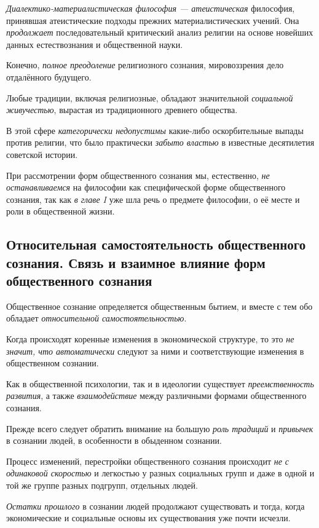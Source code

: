 \documentclass[a4paper,14pt,russian]{extreport}
\begin{document}
\emph{Диалектико-материалистическая философия --- атеистическая} философия, принявшая атеистические подходы прежних материалистических учений. Она \emph{продолжает} последовательный критический анализ религии на основе новейших данных естествознания и общественной науки.

Конечно, \emph{полное преодоление} религиозного сознания, мировоззрения дело отдалённого будущего.

Любые традиции, включая религиозные, обладают значительной \emph{социальной живучестью}, вырастая из традиционного древнего общества.

В этой сфере \emph{категорически недопустимы} какие-либо оскорбительные выпады против религии, что было практически \emph{забыто властью} в известные десятилетия советской истории.

При рассмотрении форм общественного сознания мы, естественно, \emph{не останавливаемся} на философии как специфической форме общественного сознания, так как \emph{в главе I} уже шла речь о предмете философии, о её месте и роли в общественной жизни.

\subsection{Относительная самостоятельность общественного сознания. Связь и взаимное влияние форм общественного сознания}

Общественное сознание определяется общественным бытием, и вместе с тем обо обладает \emph{относительной самостоятельностью}.

Когда происходят коренные изменения в экономической структуре, то это \emph{не значит, что автоматически} следуют за ними и соответствующие изменения в общественном сознании.

Как в общественной психологии, так и в идеологии существует \emph{преемственность развития}, а также \emph{взаимодействие} между различными формами общественного сознания.

Прежде всего следует обратить внимание на большую \emph{роль традиций} и \emph{привычек} в сознании людей, в особенности в обыденном сознании.

Процесс изменений, перестройки общественного сознания происходит \emph{не с одинаковой скоростью} и легкостью у разных социальных групп и даже в одной и той же группе разных подгрупп, отдельных людей.

\emph{Остатки прошлого} в сознании людей продолжают существовать и тогда, когда экономические и социальные основы их существования уже почти исчезли.
\end{document}
